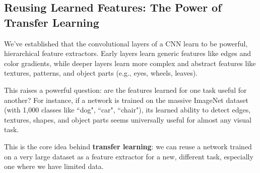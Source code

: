 \documentclass{article}
\begin{document}

\subsection{Reusing Learned Features: The Power of Transfer Learning}

We've established that the convolutional layers of a CNN learn to be powerful, hierarchical feature extractors. Early layers learn generic features like edges and color gradients, while deeper layers learn more complex and abstract features like textures, patterns, and object parts (e.g., eyes, wheels, leaves).

This raises a powerful question: are the features learned for one task useful for another? For instance, if a network is trained on the massive ImageNet dataset (with 1,000 classes like ``dog", ``car", ``chair"), its learned ability to detect edges, textures, shapes, and object parts seems universally useful for almost any visual task.

This is the core idea behind \textbf{transfer learning}: we can reuse a network trained on a very large dataset as a feature extractor for a new, different task, especially one where we have limited data.
\end{document}
